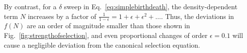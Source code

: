 \documentclass[12pt]{article}
\begin{document}
By contrast, for a $\delta$ sweep in Eq.~\eqref{eq:simplebirthdeath}, the density-dependent term $N$ increases by a factor of $\frac{1}{1-\epsilon}=1+\epsilon+\epsilon^2+\ldots$. Thus,  the deviations in $f(N)$ are an order of magnitude smaller than those shown in Fig.~\eqref{fig:strengthofselection}, and even proportional changes of order $\epsilon=0.1$ will cause a negligible deviation from the canonical selection equation.
\end{document}
